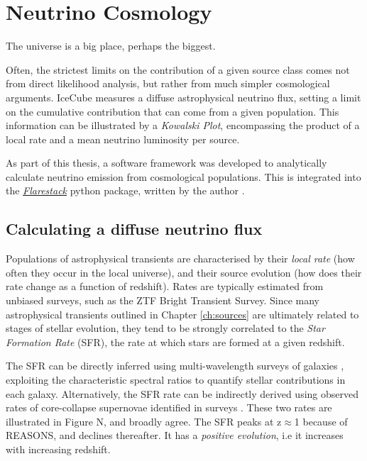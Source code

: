 \setchapterpreamble[u]{\margintoc}
\chapter{Neutrino Cosmology}
\begin{fquote}The universe is a big place, perhaps the biggest.
\end{fquote}

Often, the strictest limits on the contribution of a given source class comes not from direct likelihood analysis, but rather from much simpler cosmological arguments. IceCube measures a diffuse astrophysical neutrino flux, setting a limit on the cumulative contribution that can come from a given population. This information can be illustrated by a \emph{Kowalski Plot}, encompassing the product of a local rate and a mean neutrino luminosity per source. 

As part of this thesis, a software framework was developed to analytically calculate neutrino emission from cosmological populations. This is integrated into the \emph{\href{https://github.com/IceCubeOpenSource/flarestack}{Flarestack}} python package, written by the author .

\section{Calculating a diffuse neutrino flux}

Populations of astrophysical transients are characterised by their \emph{local rate} (how often they occur in the local universe), and their source evolution (how does their rate change as a function of redshift). Rates are typically estimated from unbiased surveys, such as the ZTF Bright Transient Survey. Since many astrophysical transients outlined in Chapter \ref{ch:sources} are ultimately related to stages of stellar evolution, they tend to be strongly correlated to the \emph{Star Formation Rate} (SFR), the rate at which stars are formed at a given redshift.

The SFR can be directly inferred using multi-wavelength surveys of galaxies , exploiting the characteristic spectral ratios to quantify stellar contributions in each galaxy. Alternatively, the SFR rate can be indirectly derived using observed rates of core-collapse supernovae identified in surveys . These two rates are illustrated in Figure N, and broadly agree. The SFR peaks at z$\approx$1 because of REASONS, and declines thereafter. It has a \emph{positive evolution}, i.e it increases with increasing redshift. 

